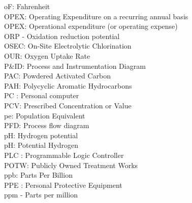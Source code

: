 \documentclass{article}
\begin{document}
oF:  Fahrenheit
\vspace{0.3cm}\\
OPEX:  Operating Expenditure on a recurring annual basis
\vspace{0.3cm}\\
OPEX:  Operational expenditure (or operating expense)
\vspace{0.3cm}\\
ORP - Oxidation reduction potential
\vspace{0.3cm}\\
OSEC:  On-Site Electrolytic Chlorination
\vspace{0.3cm}\\
OUR:  Oxygen Uptake Rate
\vspace{0.3cm}\\
P\&ID: Process and Instrumentation Diagram
\vspace{0.3cm}\\
PAC:  Powdered Activated Carbon
\vspace{0.3cm}\\
PAH:  Polycyclic Aromatic Hydrocarbons
\vspace{0.3cm}\\
PC :  Personal computer
\vspace{0.3cm}\\
PCV:  Prescribed Concentration or Value
\vspace{0.3cm}\\
pe:  Population Equivalent
\vspace{0.3cm}\\
PFD:  Process flow diagram
\vspace{0.3cm}\\
pH:  Hydrogen potential
\vspace{0.3cm}\\
pH: Potential Hydrogen
\vspace{0.3cm}\\
PLC :  Programmable Logic Controller
\vspace{0.3cm}\\
POTW:  Publicly Owned Treatment Works
\vspace{0.3cm}\\
ppb: Parts Per Billion
\vspace{0.3cm}\\
PPE :  Personal Protective Equipment  
\vspace{0.3cm}\\
ppm - Parts per million
\vspace{0.3cm}\\
\end{document}
